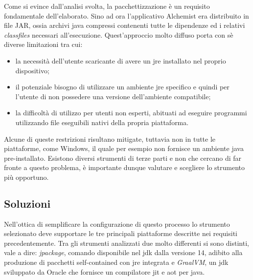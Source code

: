 Come si evince dall'analisi svolta, la pacchettizzazione è un requisito fondamentale dell'elaborato. Sino ad ora l'applicativo Alchemist era distribuito in file JAR, ossia archivi java compressi contenenti tutte le dipendenze ed i relativi \textit{classfiles} necessari all'esecuzione. Quest'approccio molto diffuso porta con sè diverse limitazioni tra cui:
\begin{itemize}
	\item la necessità dell'utente scaricante di avere un \ac{jre} installato nel proprio dispositivo;
	\item il potenziale bisogno di utilizzare un ambiente \ac{jre} specifico e quindi per l'utente di non possedere una versione dell'ambiente compatibile;
	\item la difficoltà di utilizzo per utenti non esperti, abituati ad eseguire programmi utilizzando file eseguibili nativi della propria piattaforma.
\end{itemize}
Alcune di queste restrizioni risultano mitigate, tuttavia non in tutte le piattaforme, come Windows, il quale per esempio non fornisce un ambiente java pre-installato. Esistono diversi strumenti di terze parti e non che cercano di far fronte a questo problema, è importante dunque valutare e scegliere lo strumento più opportuno.

\subsection{Soluzioni}

Nell'ottica di semplificare la configurazione di questo processo lo strumento selezionato deve supportare le tre principali piattaforme descritte nei requisiti precedentemente. Tra gli strumenti analizzati due molto differenti si sono distinti, vale a dire: \textit{jpackage}, comando disponibile nel \ac{jdk} dalla versione 14, adibito alla produzione di pacchetti self-contained con \ac{jre} integrata e \textit{GraalVM}, un \ac{jdk} sviluppato da Oracle che fornisce un compilatore \ac{jit} e \ac{aot} per java. 

